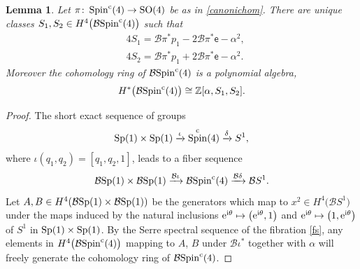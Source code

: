\documentclass[pdftex]{sigma}%
\newcommand{\Z}{\mathbb{Z}}
\DeclareMathOperator{\Spin}{Spin}
\numberwithin{equation}{section}
\newtheorem{Lemma}[Theorem]{Lemma}
\begin{document}
\begin{Lemma}
\label{cohspin}
Let $\pi\colon \Spin^{\rm c}(4) \to {\rm SO}(4)$ be
as in \eqref{canonichom}. There are unique classes $S_1,S_2 \in H^4\big({\mathcal B}{\rm Spin}^{\rm c}(4)\big)$ such
that
\begin{align*}
&4S_1={\mathcal B}\pi^* p_1 - 2{\mathcal B}\pi^* \mathsf{e} - \alpha^2, \\
&4S_2={\mathcal B}\pi^* p_1 + 2{\mathcal B}\pi^* \mathsf{e} - \alpha^2.
\end{align*}
Moreover the cohomology ring of ${\mathcal B}{\rm Spin}^{\rm c}(4)$ is a polynomial algebra,
\[
H^*\big({\mathcal B}{\rm Spin}^{\rm c}(4)\big) \cong \Z[\alpha,S_1,S_2].
\]
\end{Lemma}
\begin{proof}
The short exact sequence of groups
\[
{\rm Sp}(1) \times {\rm Sp}(1) \xrightarrow{\iota} \Spin^{\rm c}(4) \xrightarrow{\delta} S^1,
\]
where $\iota(q_1,q_2)=[q_1,q_2,1]$, leads to a fiber sequence
\begin{equation}
\label{fs}
{\mathcal B}{\rm Sp}(1)\times {\mathcal B}{\rm Sp}(1) \xrightarrow{{\mathcal B}\iota} {\mathcal B}{\rm Spin}^{\rm c}(4) \xrightarrow{{\mathcal B}\delta} {\mathcal B}S ^1.
\end{equation}
Let $A,B \in H^4({\mathcal B}{\rm Sp}(1) \times {\mathcal B}{\rm Sp}(1))$ be the generators which map to
$x^2 \in H^4\big({\mathcal B}S ^1\big)$ under the maps induced by the
natural inclusions ${\rm e}^{{\rm i}\theta} \mapsto \big({\rm e}^{{\rm i}\theta},1\big)$ and ${\rm e}^{{\rm i}\theta} \mapsto
\big(1,{\rm e}^{{\rm i}\theta}\big)$ of $S^1$ in ${\rm Sp}(1) \times {\rm Sp}(1)$.
By the Serre spectral sequence of the fibration \eqref{fs}, any elements in
$H^4\big({\mathcal B}{\rm Spin}^{\rm c}(4)\big)$ mapping to $A$, $B$ under ${\mathcal B}\iota^*$ together with $\alpha$ will
freely generate the cohomology ring of ${\mathcal B}{\rm Spin}^{\rm c}(4)$.


\end{proof}
\end{document}
